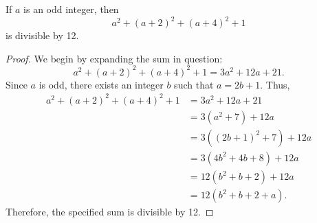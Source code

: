 \begin{proposition}[Exercise 2.1.7]
	If $a$ is an odd integer, then $$a^2 + (a + 2)^2 + (a + 4)^2 + 1$$ is divisible by 12.
\end{proposition}
\begin{proof}
	We begin by expanding the sum in question: $$a^2 + (a + 2)^2 + (a + 4)^2 + 1 = 3a^2 + 12a + 21.$$ Since $a$ is odd, there exists an integer $b$ such that $a = 2b + 1$. Thus,
	\begin{align*}
		a^2 + (a + 2)^2 + (a + 4)^2 + 1 &= 3a^2 + 12a + 21\\
		&= 3(a^2 + 7) + 12a\\
		&= 3\left(\left(2b + 1\right)^2 + 7\right) + 12a\\
		&= 3\left(4b^2 + 4b + 8\right) + 12a\\
		&= 12\left(b^2 + b + 2\right) + 12a\\
		&= 12\left(b^2 + b + 2 + a\right).
	\end{align*}
	Therefore, the specified sum is divisible by 12.
\end{proof}








